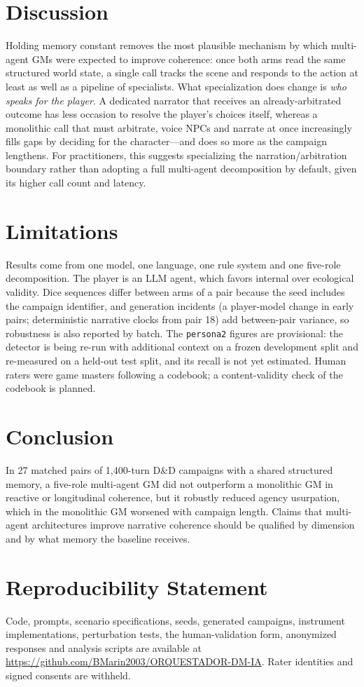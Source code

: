 \documentclass[11pt]{article}
\newcommand{\provisional}[1]{\textcolor{orange!80!black}{#1}}
\begin{document}
\section{Discussion}
Holding memory constant removes the most plausible mechanism by which multi-agent GMs were expected to improve coherence: once both arms read the same structured world state, a single call tracks the scene and responds to the action at least as well as a pipeline of specialists. What specialization does change is \emph{who speaks for the player}. A dedicated narrator that receives an already-arbitrated outcome has less occasion to resolve the player's choices itself, whereas a monolithic call that must arbitrate, voice NPCs and narrate at once increasingly fills gaps by deciding for the character---and does so more as the campaign lengthens. For practitioners, this suggests specializing the narration/arbitration boundary rather than adopting a full multi-agent decomposition by default, given its higher call count and latency.

\section{Limitations}
Results come from one model, one language, one rule system and one five-role decomposition. The player is an LLM agent, which favors internal over ecological validity. Dice sequences differ between arms of a pair because the seed includes the campaign identifier, and generation incidents (a player-model change in early pairs; deterministic narrative clocks from pair 18) add between-pair variance, so robustness is also reported by batch. \provisional{The \texttt{persona2} figures are provisional: the detector is being re-run with additional context on a frozen development split and re-measured on a held-out test split, and its recall is not yet estimated.} Human raters were game masters following a codebook; a content-validity check of the codebook is planned.

\section{Conclusion}
In 27 matched pairs of 1{,}400-turn D\&D campaigns with a shared structured memory, a five-role multi-agent GM did not outperform a monolithic GM in reactive or longitudinal coherence, but it robustly reduced agency usurpation, which in the monolithic GM worsened with campaign length. Claims that multi-agent architectures improve narrative coherence should be qualified by dimension and by what memory the baseline receives.

\section*{Reproducibility Statement}
Code, prompts, scenario specifications, seeds, generated campaigns, instrument implementations, perturbation tests, the human-validation form, anonymized responses and analysis scripts are available at \url{https://github.com/BMarin2003/ORQUESTADOR-DM-IA}. Rater identities and signed consents are withheld.



\end{document}
